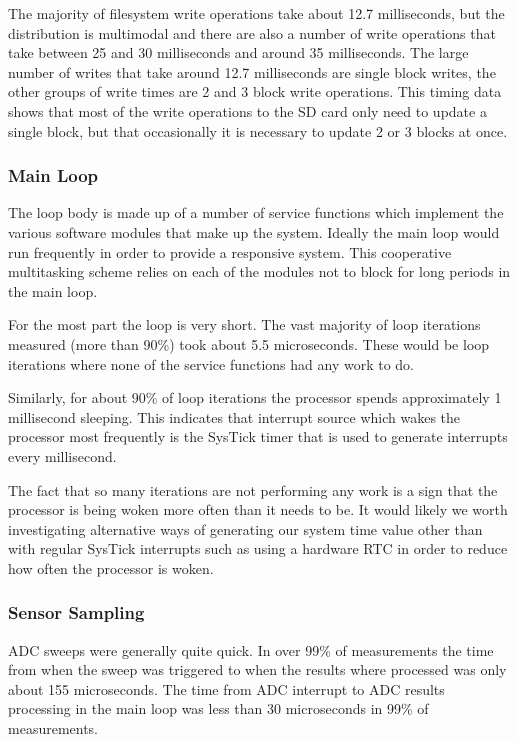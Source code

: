 The majority of filesystem write operations take about 12.7 milliseconds, but
the distribution is multimodal and there are also a number of write operations
that take between 25 and 30 milliseconds and around 35 milliseconds. The large
number of writes that take around 12.7 milliseconds are single block writes, the
other groups of write times are 2 and 3 block write operations. This timing data
shows that most of the write operations to the SD card only need to update a
single block, but that occasionally it is necessary to update 2 or 3 blocks at
once.

\subsubsection{Main Loop}

The loop body is made up of a number of service functions which implement the
various software modules that make up the system. Ideally the main loop would
run frequently in order to provide a responsive system. This cooperative
multitasking scheme relies on each of the modules not to block for long periods
in the main loop.

For the most part the loop is very short. The vast majority of loop iterations
measured (more than 90\%) took about 5.5 microseconds. These would be loop
iterations where none of the service functions had any work to do.

Similarly, for about 90\% of loop iterations the processor spends approximately
1 millisecond sleeping. This indicates that interrupt source which wakes the
processor most frequently is the SysTick timer that is used to generate
interrupts every millisecond.

The fact that so many iterations are not performing any work is a sign that the
processor is being woken more often than it needs to be. It would likely we
worth investigating alternative ways of generating our system time value other
than with regular SysTick interrupts such as using a hardware RTC in order to
reduce how often the processor is woken.

\subsubsection{Sensor Sampling}

ADC sweeps were generally quite quick. In over 99\% of measurements the time
from when the sweep was triggered to when the results where processed was only
about 155 microseconds. The time from ADC interrupt to ADC results processing
in the main loop was less than 30 microseconds in 99\% of measurements.

